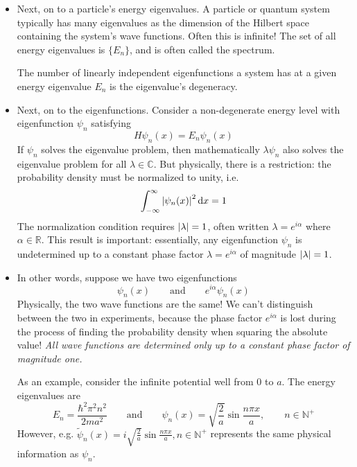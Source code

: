 \documentclass[11pt, a4paper]{article}
\newcommand{\diff}{\mathop{}\!\mathrm{d}} %
\newcommand{\eqtext}[1]{\qquad \text{#1} \qquad}
\begin{document}
\begin{itemize}
	\item Next, on to a particle's energy eigenvalues. A particle or quantum system typically has many eigenvalues as the dimension of the Hilbert space containing the system's wave functions. Often this is infinite! The set of all energy eigenvalues is $ \{E_{n}\} $, and is often called the spectrum. 
	
	The number of linearly independent eigenfunctions a system has at a given energy eigenvalue $ E_{n} $ is the eigenvalue's degeneracy.
	
	\item Next, on to the eigenfunctions. Consider a non-degenerate energy level with eigenfunction $ \psi_{n} $ satisfying
	\begin{equation*}
		H\psi_{n}(x) = E_{n}\psi_{n}(x)
	\end{equation*}
	If $ \psi_{n} $ solves the eigenvalue problem, then mathematically $ \lambda \psi_{n} $ also solves the eigenvalue problem for all $ \lambda \in \mathbb{C} $. But physically, there is a restriction: the probability density must be normalized to unity, i.e. 
	\begin{equation*}
		\int_{-\infty}^{\infty} \abs{\psi_{n}(x)}^{2} \diff x = 1
	\end{equation*}
	The normalization condition requires $ \abs{\lambda} = 1$, often written $ \lambda = e^{i \alpha} $ where $ \alpha \in \mathbb{R} $. This result is important: essentially, any eigenfunction $ \psi_{n} $ is undetermined up to a constant phase factor $ \lambda = e^{i\alpha} $ of magnitude $ \abs{\lambda} = 1 $.
	
	\item In other words, suppose we have two eigenfunctions
	\begin{equation*}
		\psi_{n}(x) \eqtext{and} e^{i \alpha}\psi_{n}(x)
	\end{equation*}
	Physically, the two wave functions are the same! We can't distinguish between the two in experiments, because the phase factor $ e^{i \alpha} $ is lost during the process of finding the probability density when squaring the absolute value! \textit{All wave functions are determined only up to a constant phase factor of magnitude one.}
	
	As an example, consider the infinite potential well from $ 0 $ to $ a $. The energy eigenvalues are
	\begin{equation*}
		E_{n} = \frac{\hbar^{2} \pi^{2} n^{2}}{2ma^{2}} \eqtext{and} \psi_{n}(x) = \sqrt{\frac{2}{a}} \sin \frac{n\pi x}{a}, \qquad n \in \mathbb{N}^{+}
	\end{equation*}
	However, e.g. $ \tilde{\psi}_{n}(x) = i \sqrt{\frac{2}{a}} \sin \frac{n\pi x}{a}, n \in \mathbb{N}^{+} $ represents the same physical information as $ \psi_{n} $. 
\end{itemize}
\end{document}
